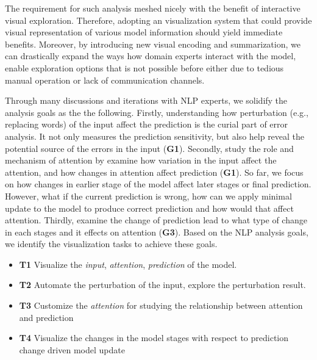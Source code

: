 The requirement for such analysis meshed nicely with the benefit of interactive visual exploration. 
Therefore, adopting an visualization system that could provide visual representation of various model information should yield immediate benefits.
%
Moreover, by introducing new visual encoding and summarization, we can drastically expand the ways how domain experts interact with the model, enable exploration options that is not possible before either due to tedious manual operation or lack of communication channels.

Through many discussions and iterations with NLP experts, we solidify the analysis goals as the the following.
Firstly, understanding how perturbation (e.g., replacing words) of the input affect the prediction is the curial part of error analysis. It not only measures the prediction sensitivity, but also help reveal the potential source of the errors in the input (\textbf{G1}).
Secondly, study the role and mechanism of attention by examine how variation in the input affect the attention, and how changes in attention affect prediction (\textbf{G1}).
So far, we focus on how changes in earlier stage of the model affect later stages or final prediction.
%
However, what if the current prediction is wrong, how can we apply minimal update to the model to produce correct prediction and how would that affect attention.
Thirdly, examine the change of prediction lead to what type of change in each stages and it effects on attention (\textbf{G3}).
%
Based on the NLP analysis goals, we identify the visualization tasks to achieve these goals.

\begin{itemize}
\item \textbf{T1} Visualize the \emph{input}, \emph{attention}, \emph{prediction} of the model.
\item \textbf{T2} Automate the perturbation of the input, explore the perturbation result.
\item \textbf{T3} Customize the \emph{attention} for studying the relationship between attention and prediction
\item \textbf{T4} Visualize the changes in the model stages with respect to prediction change driven model update 
\end{itemize}


